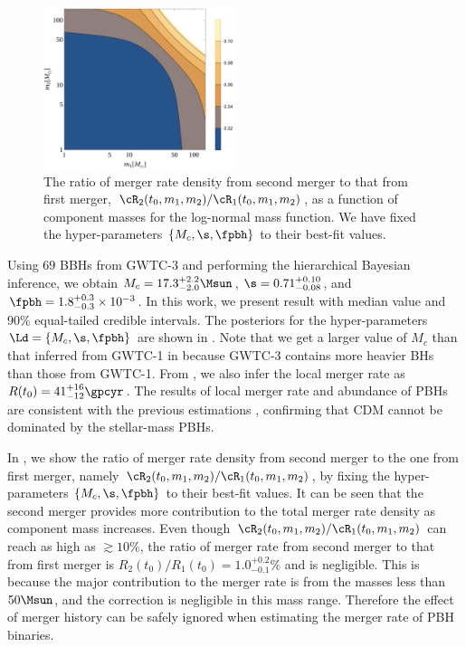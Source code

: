 \documentclass[twocolumn]{aastex631}
\begin{document}
\begin{figure}[htbp!]
	\centering
	\includegraphics[width=0.5\textwidth]{ratio-log.pdf}
	\caption{\label{ratio-log}The ratio of merger rate density from second merger to that from first merger, $\cR_2(t_0, m_1, m_2)/\cR_1(t_0, m_1, m_2)$, as a function of component masses for the log-normal mass function. We have fixed the hyper-parameters $\{M_c, \s, \fpbh\}$ to their best-fit values.}
\end{figure}

Using $69$ BBHs from GWTC-3 and performing the hierarchical Bayesian inference, we obtain $M_c = 17.3^{+2.2}_{-2.0} \Msun$, $\s = 0.71^{+0.10}_{-0.08}$, and $\fpbh = 1.8^{+0.3}_{-0.3} \times 10^{-3}$. In this work, we present result with median value and 90\% equal-tailed credible intervals. The posteriors for the hyper-parameters $\Ld = \{M_c, \s, \fpbh\}$ are shown in . Note that we get a larger value of $M_c$ than that inferred from GWTC-1 in \cite{Wu:2020drm} because GWTC-3 contains more heavier BHs than those from GWTC-1. From , we also infer the local merger rate as $R(t_0) = 41^{+16}_{-12} \gpcyr$. The results of local merger rate and abundance of PBHs are consistent with the previous estimations \citep{Chen:2018czv,Chen:2018rzo,Chen:2019irf,Wu:2020drm,Chen:2021nxo,Chen:2022fda}, confirming that CDM cannot be dominated by the stellar-mass PBHs.


In , we show the ratio of merger rate density from second merger to the one from first merger, namely $\cR_2(t_0, m_1, m_2)/\cR_1(t_0, m_1, m_2)$, by fixing the hyper-parameters $\{M_c, \s, \fpbh\}$ to their best-fit values. It can be seen that the second merger provides more contribution to the total merger rate density as component mass increases. Even though $\cR_2(t_0, m_1, m_2)/\cR_1(t_0, m_1, m_2)$ can reach as high as $\gtrsim 10\%$, the ratio of merger rate from second merger to that from first merger is $R_2(t_0)/R_1(t_0) = 1.0^{+0.2}_{-0.1}\%$ and is negligible. This is because the major contribution to the merger rate is from the masses less than $50\Msun$, and the correction is negligible in this mass range. Therefore the effect of merger history can be safely ignored when estimating the merger rate of PBH binaries.
\end{document}
